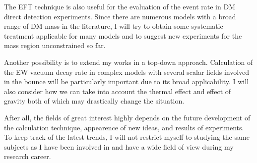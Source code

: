 \documentclass[12pt,notitlepage]{article}
\begin{document}
The EFT technique is also useful for the evaluation of the event rate in DM direct detection experiments.
Since there are numerous models with a broad range of DM mass in the literature, I will try to obtain some systematic treatment applicable for many models and to suggest new experiments for the mass region unconstrained so far.

Another possibility is to extend my works in a top-down approach.
Calculation of the EW vacuum decay rate in complex models with several scalar fields involved in the bounce will be particularly important due to its broad applicability.
I will also consider how we can take into account the thermal effect and effect of gravity both of which may drastically change the situation.

After all, the fields of great interest highly depends on the future development of the calculation technique, appearence of new ideas, and results of experiments.
To keep track of the latest trends, I will not restrict myself to studying the same subjects as I have been involved in and have a wide field of view during my research career.
\end{document}
